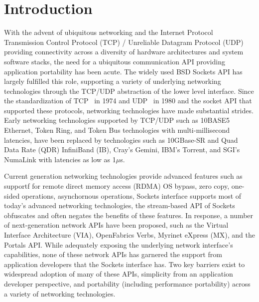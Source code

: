 \section{Introduction}
\label{sec:introduction}


With the advent of ubiquitous networking and the Internet
Protocol~\cite{ip-rfc-xxx} 
Transmission Control Protocol (TCP) / Unreliable Datagram Protocol
(UDP) providing connectivity across a diversity of hardware
architectures and system software stacks, the need for a ubiquitous
communication API providing application portability has been
acute. The widely used BSD Sockets API has largely fulfilled this
role, supporting a variety of underlying networking technologies
through the TCP/UDP abstraction of the lower level interface. Since
the standardization of TCP~\cite{tcp-rfc-675} in 1974 and
UDP~\cite{udp-rfc-768} in 1980 and the socket API that supported these
protocols, networking technologies have made substantial
strides. Early networking technologies supported by TCP/UDP such as
10BASE5 Ethernet, Token Ring, and Token Bus technologies with
multi-millisecond latencies, have been replaced by technologies such
as 10GBase-SR and Quad Data Rate (QDR) InfiniBand (IB), Cray's Gemini,
IBM's Torrent, and SGI's NumaLink with latencies as low as 1$\mu$s.

Current generation networking technologies provide advanced features
such as supportf for remote direct memory access (RDMA) OS bypass,
zero copy, one-sided operations, asynchornous operations,
Sockets interface supports most of today's advanced networking
technologies, 
the stream-based API of Sockets obfuscates and often
negates the benefits of these features. In response, a number of
next-generation network APIs have been proposed, such as the Virtual
Interface Architecture (VIA), OpenFabrics Verbs, Myrinet eXpress (MX),
and the Portals API. While adequately exposing the underlying network
interface's capabilities, none of these network APIs has garnered the
support from application developers that the Sockets interface
has. Two key barriers exist to widespread adoption of many of these
APIs, simplicity from an application developer perspective, and
portability (including performance portability) across a variety of
networking technologies.

